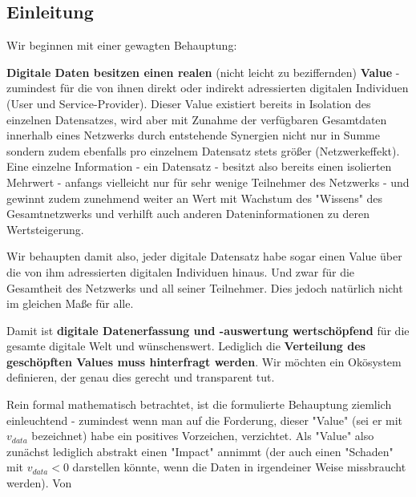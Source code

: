 \subsection{Einleitung}
\label{sec:eco_einleitung}

Wir beginnen mit einer gewagten Behauptung:

\vspace{0.2cm}

\begin{Hypothese}
\textbf{Digitale Daten besitzen einen realen} (nicht leicht zu beziffernden) \textbf{Value} - zumindest für die von ihnen direkt oder indirekt adressierten digitalen Individuen (User und Service-Provider). Dieser Value existiert bereits in Isolation des einzelnen Datensatzes, wird aber mit Zunahme der verfügbaren Gesamtdaten innerhalb eines Netzwerks durch entstehende Synergien nicht nur in Summe sondern zudem ebenfalls pro einzelnem Datensatz stets größer (Netzwerkeffekt). Eine einzelne Information - ein Datensatz - besitzt also bereits einen isolierten Mehrwert - anfangs vielleicht nur für sehr wenige Teilnehmer des Netzwerks - und gewinnt zudem zunehmend weiter an Wert mit Wachstum des "Wissens" des Gesamtnetzwerks und verhilft auch anderen Dateninformationen zu deren Wertsteigerung.

Wir behaupten damit also, jeder digitale Datensatz habe sogar einen Value über die von ihm adressierten digitalen Individuen hinaus. Und zwar für die Gesamtheit des Netzwerks und all seiner Teilnehmer. Dies jedoch natürlich nicht im gleichen Maße für alle.

\vspace{0.1cm}

Damit ist \textbf{digitale Datenerfassung und -auswertung wertschöpfend} für die gesamte digitale Welt und wünschenswert. Lediglich die \textbf{Verteilung des geschöpften Values muss hinterfragt werden}. Wir möchten ein Okösystem definieren, der genau dies gerecht und transparent tut.
 
\end{Hypothese}

\vspace{0.3cm}
Rein formal mathematisch betrachtet, ist die formulierte Behauptung ziemlich einleuchtend - zumindest wenn man auf die Forderung, dieser "Value" (sei er mit $v_{data}$ bezeichnet) habe ein positives Vorzeichen, verzichtet. Als "Value" also zunächst lediglich abstrakt einen "Impact" annimmt (der auch einen "Schaden" mit $v_{data} < 0$ darstellen könnte, wenn die Daten in irgendeiner Weise missbraucht werden). Von 

